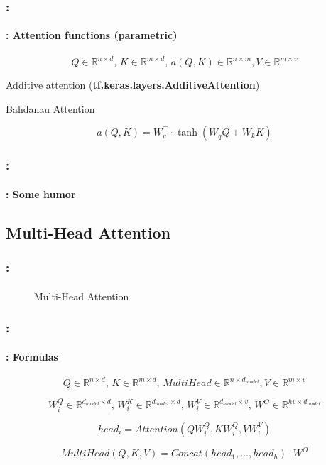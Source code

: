 \documentclass[xcolor=table]{beamer}
\begin{document}
\begin{frame}
	\frametitle{\insertshortsubtitle: \insertsection}
	\framesubtitle{\insertsubsection: Attention functions (parametric)}
	
	\[Q \in \mathbb{R}^{n \times d}, \, K \in \mathbb{R}^{m \times d}, \, a(Q, K) \in \mathbb{R}^{n \times m}, V \in \mathbb{R}^{m \times v} \]
	
	\vspace{12pt}
	
	Additive attention (\textbf{tf.keras.layers.AdditiveAttention})
	
	Bahdanau Attention
	
	\[a(Q, K) = W_v^\top \cdot \tanh(W_q Q + W_k K)\]
	
\end{frame}


\begin{frame}
	\frametitle{\insertshortsubtitle: \insertsection}
	\framesubtitle{\insertsubsection: Some humor}
	
	\begin{center}
	\end{center}
	
\end{frame}

\subsection{Multi-Head Attention}

\begin{frame}
	\frametitle{\insertshortsubtitle: \insertsection}
	\framesubtitle{\insertsubsection}

	\begin{figure}
		\centering
		
		\vskip-12pt
		\caption{Multi-Head Attention \cite{2017-vaswani-al}}
	\end{figure}
	
\end{frame}

\begin{frame}
	\frametitle{\insertshortsubtitle: \insertsection}
	\framesubtitle{\insertsubsection: Formulas}
	
	\[Q \in \mathbb{R}^{n \times d}, \, K \in \mathbb{R}^{m \times d}, \, MultiHead \in \mathbb{R}^{n \times d_{model}}, V \in \mathbb{R}^{m \times v} \]
	
	\[W^Q_i \in \mathbb{R}^{d_{model} \times d}, \,  W^K_i \in \mathbb{R}^{d_{model} \times d}, \, W^V_i \in \mathbb{R}^{d_{model} \times v}, \, W^O \in \mathbb{R}^{hv \times d_{model}}\]
	
	\[head_i = Attention(Q W^Q_i, K W^Q_i, V W^V_i)\]
	
	\[MultiHead(Q, K, V) = Concat(head_1, \ldots, head_h) \cdot W^O\]
	
	
\end{frame}
\end{document}
